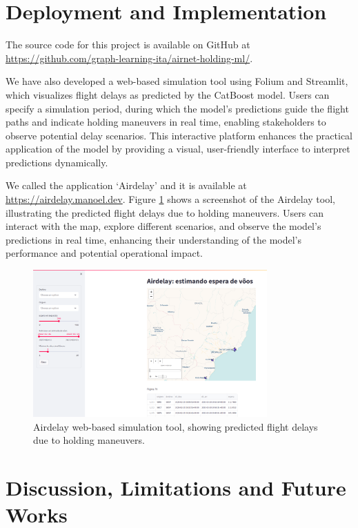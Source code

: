 \section{Deployment and Implementation}

The source code for this project is available on GitHub at
\url{https://github.com/graph-learning-ita/airnet-holding-ml/}.

We have also developed a web-based simulation tool using Folium and
Streamlit, which visualizes flight delays as predicted by the CatBoost
model. Users can specify a simulation period, during which the model's
predictions guide the flight paths and indicate holding maneuvers in
real time, enabling stakeholders to observe potential delay
scenarios. This interactive platform enhances the practical
application of the model by providing a visual, user-friendly
interface to interpret predictions dynamically.

We called the application `Airdelay' and it is available at
\url{https://airdelay.manoel.dev}. Figure \ref{fig:airdelay} shows a
screenshot of the Airdelay tool, illustrating the predicted flight
delays due to holding maneuvers. Users can interact with the map,
explore different scenarios, and observe the model's predictions in
real time, enhancing their understanding of the model's performance
and potential operational impact.

\begin{figure}
    \centering \includegraphics[width=0.8\textwidth]{img/airdelay.png}
    \caption{Airdelay web-based simulation tool, showing predicted
    flight delays due to holding maneuvers.}
    \label{fig:airdelay}
\end{figure}

\section{Discussion, Limitations and Future Works}

